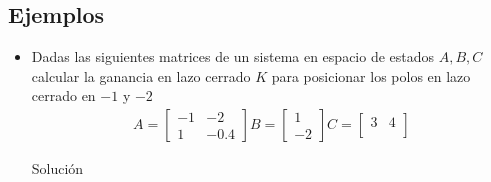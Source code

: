 \documentclass[12pt]{article}
\begin{document}
\subsection{Ejemplos}
\begin{itemize}
    \item Dadas las siguientes matrices de un sistema en espacio de estados $A,B,C$ calcular la ganancia en lazo cerrado $K$ para posicionar los polos en lazo cerrado en $-1$ y $-2$
    \begin{equation}
        \begin{split}
            A=
            \begin{bmatrix}
                -1 & -2 \\
                1 & -0.4
            \end{bmatrix}
            B=
            \begin{bmatrix}
                1 \\
                -2
            \end{bmatrix}
            C=
            \begin{bmatrix}
                3 & 4 \\
            \end{bmatrix}
        \end{split}
        \label{eq:ackermann_ejem1}
    \end{equation}

    Solución


\end{itemize}
\end{document}
